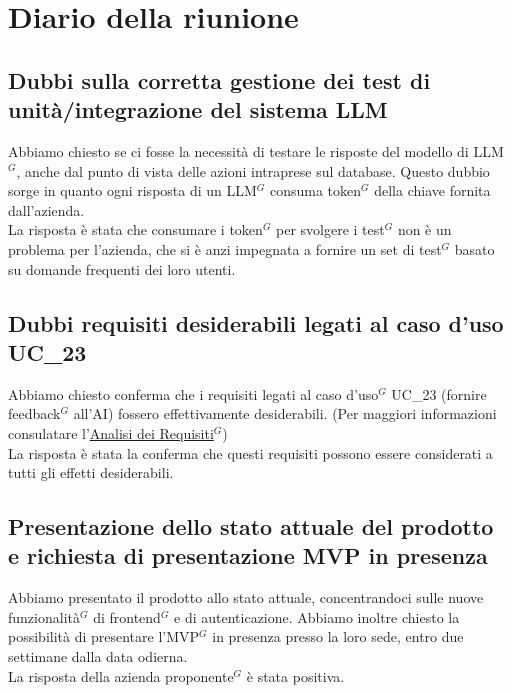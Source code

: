 \section{Diario della riunione}

\subsection{Dubbi sulla corretta gestione dei test di unità/integrazione del sistema LLM}
Abbiamo chiesto se ci fosse la necessità di testare le risposte del modello di LLM$^G$, anche dal punto di vista delle azioni intraprese sul database. Questo dubbio sorge in quanto
ogni risposta di un LLM$^G$ consuma token$^G$ della chiave fornita dall'azienda.\\
La risposta è stata che consumare i token$^G$ per svolgere i test$^G$ non è un problema per l'azienda, che si è anzi impegnata a fornire un set di test$^G$ basato su domande frequenti
dei loro utenti.

\subsection{Dubbi requisiti desiderabili legati al caso d'uso UC\_23}
Abbiamo chiesto conferma che i requisiti legati al caso d'uso$^G$ UC\_23 (fornire feedback$^G$ all'AI) fossero effettivamente desiderabili. 
(Per maggiori informazioni consulatare l'\href{https://nullpointersgroup.github.io/Documentazione/output/PB/Documenti%20Esterni/Analisi_dei_Requisiti.pdf}{Analisi dei Requisiti$^G$}) \\
La risposta è stata la conferma che questi requisiti possono essere considerati a tutti gli effetti desiderabili.

\subsection{Presentazione dello stato attuale del prodotto e richiesta di presentazione MVP in presenza}
Abbiamo presentato il prodotto allo stato attuale, concentrandoci sulle nuove funzionalità$^G$ di frontend$^G$ e di autenticazione.
Abbiamo inoltre chiesto la possibilità di presentare l'MVP$^G$ in presenza presso la loro sede, entro due settimane dalla data odierna.\\
La risposta della azienda proponente$^G$ è stata positiva.